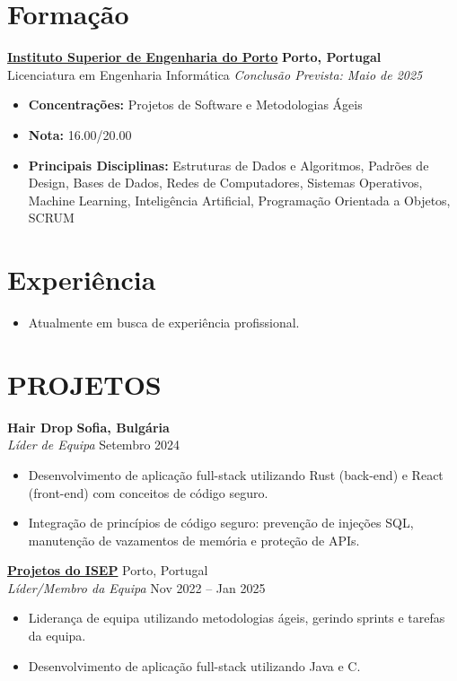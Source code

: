 \documentclass[10pt, letterpaper]{article}
\newenvironment{highlights}{
    \begin{itemize}[
        topsep=0.10 cm,
        parsep=0.10 cm,
        partopsep=0pt,
        itemsep=0pt,
        leftmargin=1cm %
    ]
}{
    \end{itemize}
}
\newenvironment{subhighlights}{
    \begin{itemize}[
        topsep=0.10 cm,
        parsep=0.10 cm,
        partopsep=0pt,
        itemsep=0pt,
        leftmargin=1.5cm, %
        label=$\vcenter{\hbox{\scriptsize$\circ$}}$ %
    ]
}{
    \end{itemize}
}
\begin{document}
\section{Formação}
\textbf{\href{https://www.isep.ipp.pt}{Instituto Superior de Engenharia do Porto}} \hfill \textbf{Porto, Portugal} \\
Licenciatura em Engenharia Informática \hfill \textit{Conclusão Prevista: Maio de 2025} \\
\begin{subhighlights}
    \item \textbf{Concentrações:} Projetos de Software e Metodologias Ágeis
    \item \textbf{Nota:} 16.00/20.00
    \item \textbf{Principais Disciplinas:} Estruturas de Dados e Algoritmos, Padrões de Design, Bases de Dados, 
    Redes de Computadores, Sistemas Operativos, Machine Learning, Inteligência Artificial, Programação Orientada a Objetos, SCRUM
\end{subhighlights}

\section{Experiência}
\begin{highlights}
    \item Atualmente em busca de experiência profissional.
\end{highlights}
\section{PROJETOS}
\textbf{Hair Drop} \hfill \textbf{Sofia, Bulgária} \\
\textit{Líder de Equipa} \hfill Setembro 2024 \\
\begin{highlights}
    \item Desenvolvimento de aplicação full-stack utilizando Rust (back-end) e React (front-end) com conceitos de código seguro.
    \item Integração de princípios de código seguro: prevenção de injeções SQL, manutenção de vazamentos de memória e proteção de APIs.
\end{highlights}

\textbf{\href{https://purenimble.github.io/projects}{Projetos do ISEP}} \hfill Porto, Portugal \\
\textit{Líder/Membro da Equipa} \hfill Nov 2022 – Jan 2025 \\
\begin{highlights}
    \item Liderança de equipa utilizando metodologias ágeis, gerindo sprints e tarefas da equipa.
    \item Desenvolvimento de aplicação full-stack utilizando Java e C.
\end{highlights}
\end{document}
